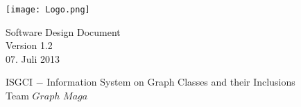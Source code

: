 \documentclass[10pt,a4paper]{article}
\begin{document}
\thispagestyle{empty} %
\begin{center}
\texttt{[image: Logo.png]}
\end{center}


\vspace*{1cm} 
\begin{center}
{\huge Software Design Document}\\
{\large Version 1.2}\\
{\large 07. Juli 2013}\\
\end{center}

\begin{center}
{\large ISGCI $-$ Information System on Graph Classes and their Inclusions}\\
{\large Team $Graph$ $Maga$}
\end{center}


\newpage


\tableofcontents
\newpage
\end{document}
